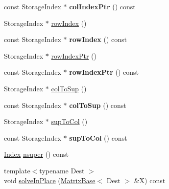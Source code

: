 \begin{DoxyCompactItemize}
\item 
\mbox{\label{group___sparse_l_u___module_a764f612ebc0bf7ec9118b2cabc280861}} 
const Storage\+Index $\ast$ {\bfseries col\+Index\+Ptr} () const
\item 
Storage\+Index $\ast$ \hyperlink{group___sparse_l_u___module_a8e6b4f399aa468a10e58db627d43a12a}{row\+Index} ()
\item 
\mbox{\label{group___sparse_l_u___module_a3194b3b2c7874afdbd0d1a19c53fd140}} 
const Storage\+Index $\ast$ {\bfseries row\+Index} () const
\item 
Storage\+Index $\ast$ \hyperlink{group___sparse_l_u___module_a826186a823bf49f81b20673cce741250}{row\+Index\+Ptr} ()
\item 
\mbox{\label{group___sparse_l_u___module_a45c1a5bec04eaf3da78ad2f207c30a74}} 
const Storage\+Index $\ast$ {\bfseries row\+Index\+Ptr} () const
\item 
Storage\+Index $\ast$ \hyperlink{group___sparse_l_u___module_a1e2c012b63809715188aa7f0c722868d}{col\+To\+Sup} ()
\item 
\mbox{\label{group___sparse_l_u___module_a1da320fc4656efe1013215ef001b7195}} 
const Storage\+Index $\ast$ {\bfseries col\+To\+Sup} () const
\item 
Storage\+Index $\ast$ \hyperlink{group___sparse_l_u___module_ab2b1bdd663288f1f2af09ec42a0a62a5}{sup\+To\+Col} ()
\item 
\mbox{\label{group___sparse_l_u___module_a0a613183f2c014fda26c7a539d555576}} 
const Storage\+Index $\ast$ {\bfseries sup\+To\+Col} () const
\item 
\hyperlink{namespace_eigen_a62e77e0933482dafde8fe197d9a2cfde}{Index} \hyperlink{group___sparse_l_u___module_a9c0b29102914a6ef9cfd6280fa016fa8}{nsuper} () const
\item 
\mbox{\label{group___sparse_l_u___module_ab93581127fd87b6bc467b6f67fcf4eeb}} 
{\footnotesize template$<$typename Dest $>$ }\\void \hyperlink{group___sparse_l_u___module_ab93581127fd87b6bc467b6f67fcf4eeb}{solve\+In\+Place} (\hyperlink{group___core___module_class_eigen_1_1_matrix_base}{Matrix\+Base}$<$ Dest $>$ \&X) const

\end{DoxyCompactItemize}
